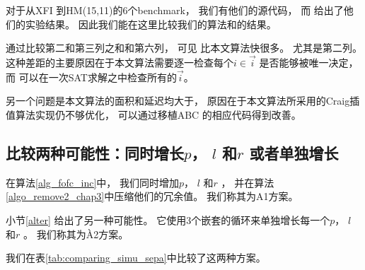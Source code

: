 对于从XFI 到HM(15,11)的6个benchmark，
我们有他们的源代码，
而 给出了他们的实验结果。
因此我们能在这里比较我们的算法和的结果。

通过比较第二和第三列之和和第六列，
可见 比本文算法快很多。
尤其是第二列。
这种差距的主要原因在于本文算法需要逐一检查每个$i\in \vec{i}$ 是否能够被唯一决定，
而 可以在一次SAT求解之中检查所有的$\vec{i}$。

另一个问题是本文算法的面积和延迟均大于，
原因在于本文算法所采用的Craig插值算法实现仍不够优化，
可以通过移植ABC 的相应代码得到改善。




\subsection{比较两种可能性：同时增长$p$， $l$ 和$r$ 或者单独增长}\label{subsec_incr_plr_exp}

在算法\ref{alg_fofc_inc}中，
我们同时增加$p$， $l$ 和$r$ ，
并在算法\ref{algo_remove2_chap3}中压缩他们的冗余值。
我们称其为A1方案。

小节\ref{alter} 给出了另一种可能性。
它使用3个嵌套的循环来单独增长每一个$p$， $l$ 和$r$ 。
我们称其为À2方案。

我们在表\ref{tab:comparing_simu_sepa}中比较了这两种方案。

